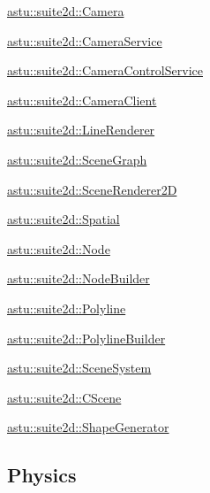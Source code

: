 \begin{DoxyItemize}
\item \hyperlink{classastu_1_1suite2d_1_1Camera}{astu\+::suite2d\+::\+Camera}
\item \hyperlink{classastu_1_1suite2d_1_1CameraService}{astu\+::suite2d\+::\+Camera\+Service}
\item \hyperlink{classastu_1_1suite2d_1_1CameraControlService}{astu\+::suite2d\+::\+Camera\+Control\+Service}
\item \hyperlink{classastu_1_1suite2d_1_1CameraClient}{astu\+::suite2d\+::\+Camera\+Client}
\item \hyperlink{classastu_1_1suite2d_1_1LineRenderer}{astu\+::suite2d\+::\+Line\+Renderer}
\item \hyperlink{classastu_1_1suite2d_1_1SceneGraph}{astu\+::suite2d\+::\+Scene\+Graph}
\item \hyperlink{classastu_1_1suite2d_1_1SceneRenderer2D}{astu\+::suite2d\+::\+Scene\+Renderer2D}
\item \hyperlink{classastu_1_1suite2d_1_1Spatial}{astu\+::suite2d\+::\+Spatial}
\item \hyperlink{classastu_1_1suite2d_1_1Node}{astu\+::suite2d\+::\+Node}
\item \hyperlink{classastu_1_1suite2d_1_1NodeBuilder}{astu\+::suite2d\+::\+Node\+Builder}
\item \hyperlink{classastu_1_1suite2d_1_1Polyline}{astu\+::suite2d\+::\+Polyline}
\item \hyperlink{classastu_1_1suite2d_1_1PolylineBuilder}{astu\+::suite2d\+::\+Polyline\+Builder}
\item \hyperlink{classastu_1_1suite2d_1_1SceneSystem}{astu\+::suite2d\+::\+Scene\+System}
\item \hyperlink{classastu_1_1suite2d_1_1CScene}{astu\+::suite2d\+::\+C\+Scene}
\item \hyperlink{classastu_1_1suite2d_1_1ShapeGenerator}{astu\+::suite2d\+::\+Shape\+Generator}
\end{DoxyItemize}\hypertarget{group__suite2d__group_physics_sect}{}\subsection{Physics}\label{group__suite2d__group_physics_sect}

